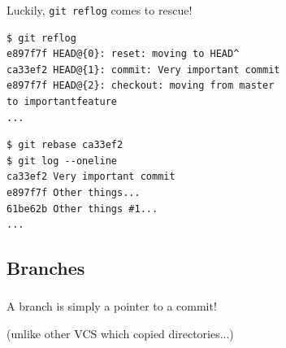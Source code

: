 
\begin{frame}[fragile]
  \frametitle{\insertsubsection}

Luckily, \texttt{git reflog} comes to rescue!

\begin{verbatim}
$ git reflog
e897f7f HEAD@{0}: reset: moving to HEAD^
ca33ef2 HEAD@{1}: commit: Very important commit
e897f7f HEAD@{2}: checkout: moving from master
to importantfeature
...
\end{verbatim}

\begin{verbatim}
$ git rebase ca33ef2
$ git log --oneline
ca33ef2 Very important commit
e897f7f Other things...
61be62b Other things #1...
...
\end{verbatim}

\end{frame}


\subsection{Branches}

\begin{frame}
  \begin{center}
    \textbf{\Huge{\insertsubsection}}
  \end{center}
\end{frame}


\begin{frame}
  \frametitle{\insertsubsection}

  \begin{center}
    \Large{A branch is simply a pointer to a commit!}\vspace{10pt}

    \small{(unlike other VCS which copied directories...)}
  \end{center}

\end{frame}


